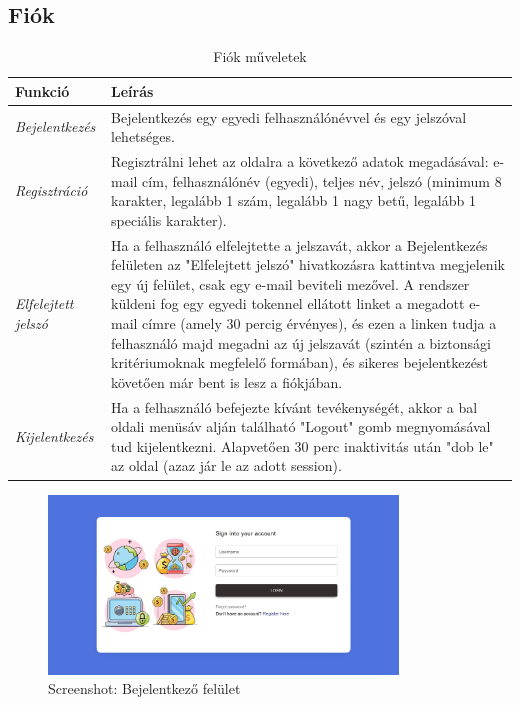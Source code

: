 \subsection{Fiók}
\begin{table}[H]
	\centering
	\begin{tabular}{ | m{} | m{} | }
		\hline
		\textbf{Funkció} & \textbf{Leírás} \\
		\hline \hline
		\emph{Bejelentkezés} & Bejelentkezés egy egyedi felhasználónévvel és egy jelszóval lehetséges. \\
		\hline
		\emph{Regisztráció} &  Regisztrálni lehet az oldalra a következő adatok megadásával: e-mail cím, felhasználónév (egyedi), teljes név, jelszó (minimum 8 karakter, legalább 1 szám, legalább 1 nagy betű, legalább 1 speciális karakter).  \\
		\hline
		\emph{Elfelejtett jelszó} & Ha a felhasználó elfelejtette a jelszavát, akkor a Bejelentkezés felületen az "Elfelejtett jelszó" hivatkozásra kattintva megjelenik egy új felület, csak egy e-mail beviteli mezővel. A rendszer küldeni fog egy egyedi tokennel ellátott linket a megadott e-mail címre (amely 30 percig érvényes), és ezen a linken tudja a felhasználó majd megadni az új jelszavát (szintén a biztonsági kritériumoknak megfelelő formában), és sikeres bejelentkezést követően már bent is lesz a fiókjában. \\
		\hline
		\emph{Kijelentkezés} & Ha a felhasználó befejezte kívánt tevékenységét, akkor a bal oldali menüsáv alján található "Logout" gomb megnyomásával tud kijelentkezni. Alapvetően 30 perc inaktivitás után "dob le" az oldal (azaz jár le az adott session). \\
		\hline
	\end{tabular}
	\caption{Fiók műveletek}
	\label{tab:account}
\end{table}

\begin{figure}[H]
	\centering
	\includegraphics[height=180px]{img/login-screenshot}
	\caption{Screenshot: Bejelentkező felület}
	\label{fig:login}
\end{figure}


